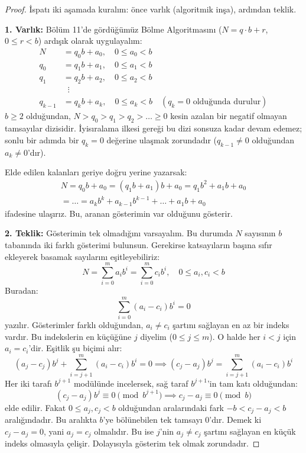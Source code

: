 \begin{proof}
İspatı iki aşamada kuralım: önce varlık (algoritmik inşa), ardından teklik.

\textbf{1. Varlık:} Bölüm 11'de gördüğümüz Bölme Algoritmasını ($N = q \cdot b + r$, $0 \le r < b$) ardışık olarak uygulayalım:
\begin{align*}
N &= q_0 b + a_0, \quad 0 \le a_0 < b \\
q_0 &= q_1 b + a_1, \quad 0 \le a_1 < b \\
q_1 &= q_2 b + a_2, \quad 0 \le a_2 < b \\
&\;\;\vdots \\
q_{k-1} &= q_k b + a_k, \quad 0 \le a_k < b \quad (q_k = 0 \text{ olduğunda durulur})
\end{align*}
$b \ge 2$ olduğundan, $N > q_0 > q_1 > q_2 > \dots \ge 0$ kesin azalan bir negatif olmayan tamsayılar dizisidir. İyisıralama ilkesi gereği bu dizi sonsuza kadar devam edemez; sonlu bir adımda bir $q_k = 0$ değerine ulaşmak zorundadır ($q_{k-1} \ne 0$ olduğundan $a_k \ne 0$'dır).

Elde edilen kalanları geriye doğru yerine yazarsak:
\begin{multline*}
N = q_0 b + a_0 = (q_1 b + a_1) b + a_0 = q_1 b^2 + a_1 b + a_0 \\
= \dots = a_k b^k + a_{k-1} b^{k-1} + \dots + a_1 b + a_0
\end{multline*}
ifadesine ulaşırız. Bu, aranan gösterimin var olduğunu gösterir.

\textbf{2. Teklik:} Gösterimin tek olmadığını varsayalım. Bu durumda $N$ sayısının $b$ tabanında iki farklı gösterimi bulunsun. Gerekirse katsayıların başına sıfır ekleyerek basamak sayılarını eşitleyebiliriz:
\[
N = \sum_{i=0}^{m} a_i b^i = \sum_{i=0}^{m} c_i b^i, \quad 0 \le a_i, c_i < b
\]
Buradan:
\[
\sum_{i=0}^{m} (a_i - c_i) b^i = 0
\]
yazılır. Gösterimler farklı olduğundan, $a_i \ne c_i$ şartını sağlayan en az bir indeks vardır. Bu indekslerin en küçüğüne $j$ diyelim ($0 \le j \le m$). O halde her $i < j$ için $a_i = c_i$'dir. Eşitlik şu biçimi alır:
\[
(a_j - c_j) b^j + \sum_{i=j+1}^{m} (a_i - c_i) b^i = 0 \implies (c_j - a_j) b^j = \sum_{i=j+1}^{m} (a_i - c_i) b^i
\]
Her iki tarafı $b^{j+1}$ modülünde incelersek, sağ taraf $b^{j+1}$'in tam katı olduğundan:
\[
(c_j - a_j) b^j \equiv 0 \pmod{b^{j+1}} \implies c_j - a_j \equiv 0 \pmod b
\]
elde edilir. Fakat $0 \le a_j, c_j < b$ olduğundan aralarındaki fark $-b < c_j - a_j < b$ aralığındadır. Bu aralıkta $b$'ye bölünebilen tek tamsayı $0$'dır. Demek ki $c_j - a_j = 0$, yani $a_j = c_j$ olmalıdır. Bu ise $j$'nin $a_j \ne c_j$ şartını sağlayan en küçük indeks olmasıyla çelişir. Dolayısıyla gösterim tek olmak zorundadır.
\end{proof}

